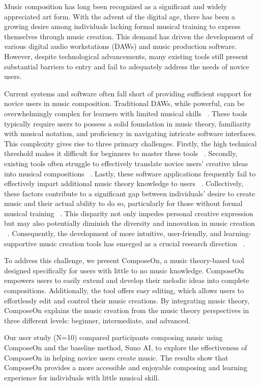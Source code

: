 Music composition has long been recognized as a significant and widely appreciated art form. With the advent of the digital age, there has been a growing desire among individuals lacking formal musical training to express themselves through music creation. This demand has driven the development of various digital audio workstations (DAWs) and music production software. However, despite technological advancements, many existing tools still present substantial barriers to entry and fail to adequately address the needs of novice users.

Current systems and software often fall short of providing sufficient support for novice users in music composition. Traditional DAWs, while powerful, can be overwhelmingly complex for learners with limited musical skills ~\cite{r16}. These tools typically require users to possess a solid foundation in music theory, familiarity with musical notation, and proficiency in navigating intricate software interfaces. This complexity gives rise to three primary challenges. Firstly, the high technical threshold makes it difficult for beginners to master these tools ~\cite{r14}. Secondly, existing tools often struggle to effectively translate novice users' creative ideas into musical compositions  ~\cite{r15}. Lastly, these software applications frequently fail to effectively impart additional music theory knowledge to users ~\cite{r17}. Collectively, these factors contribute to a significant gap between individuals' desire to create music and their actual ability to do so, particularly for those without formal musical training ~\cite{r13}. This disparity not only impedes personal creative expression but may also potentially diminish the diversity and innovation in music creation  ~\cite{r21}. Consequently, the development of more intuitive, user-friendly, and learning-supportive music creation tools has emerged as a crucial research direction  ~\cite{r16}.

To address this challenge, we present ComposeOn, a music theory-based tool designed specifically for users with little to no music knowledge. ComposeOn empowers users to easily extend and develop their melodic ideas into complete compositions. Additionally, the tool offers easy editing, which allows users to effortlessly edit and control their music creations. By integrating music theory, ComposeOn explains the music creation from the music theory perspectives in three different levels: beginner, intermediate, and advanced.

Our user study (N=10) compared participants composing music using ComposeOn and the baseline method, Suno AI, to explore the effectiveness of ComposeOn in helping novice users create music. The results show that ComposeOn provides a more accessible and enjoyable composing and learning experience for individuals with little musical skill. 

